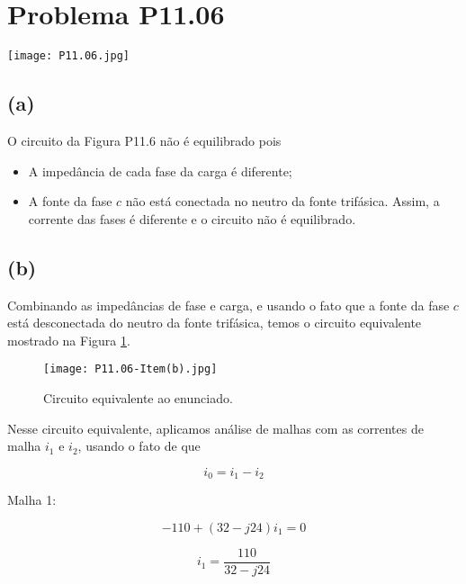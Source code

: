 
\section*{Problema P11.06}

\renewcommand*\thesection{11.06}

\begin{center}
    \texttt{[image: P11.06.jpg]}
\end{center}

\subsection*{(a)}

O circuito da Figura P11.6 não é equilibrado pois  
\begin{itemize}
    \item A impedância de cada fase da carga é diferente;
    \item A fonte da fase $c$ não está conectada no neutro da fonte trifásica. Assim, a corrente das fases é diferente e o circuito não é equilibrado.
\end{itemize}

\subsection*{(b)}

Combinando as impedâncias de fase e carga, e usando o fato que a fonte da fase $c$ está desconectada do neutro da fonte trifásica, 
temos o circuito equivalente mostrado na Figura \ref*{fig:11.06.1}.

\begin{figure}[hb]
    \centering
    \caption{Circuito equivalente ao enunciado.}
      \centering
      \texttt{[image: P11.06-Item(b).jpg]} \\
    \label{fig:11.06.1}
\end{figure}

Nesse circuito equivalente, aplicamos análise de malhas com as correntes de malha $i_1$ e $i_2$, usando o fato de que   

\begin{equation}\label{eq:11.06.1}
    i_0 = i_1 - i_2
\end{equation}

Malha 1:   

\[ -110 + (32 - j24)i_1 = 0 \]

\[ i_1 = \frac{110}{32 - j24} \]

